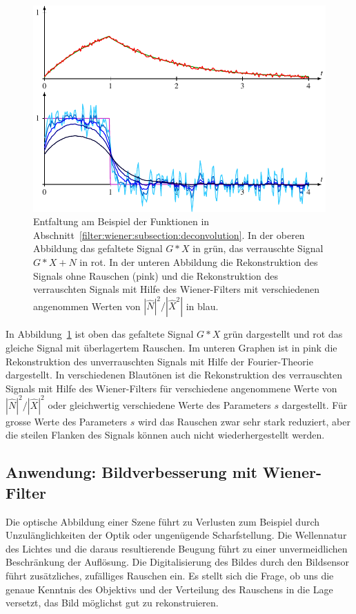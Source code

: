 \begin{figure}
\centering
\includegraphics{8-filter/images/filterung.pdf}
\caption{Entfaltung am Beispiel der Funktionen in
Abschnitt~\ref{filter:wiener:subsection:deconvolution}.
In der oberen Abbildung das gefaltete Signal $G*X$ in grün,
das verrauschte Signal $G*X+N$ in rot.
In der unteren Abbildung die Rekonstruktion des Signals ohne
Rauschen (pink) und die Rekonstruktion des verrauschten Signals
mit Hilfe des Wiener-Filters mit verschiedenen angenommen
Werten von $|\hat{N}|^2/|\hat{X}^2|$ in blau.
\label{filter:wiener:rekonstruktion}}
\end{figure}
In Abbildung~\ref{filter:wiener:rekonstruktion} ist oben das 
gefaltete Signal $G*X$ grün dargestellt und rot das gleiche Signal
mit überlagertem Rauschen.
Im unteren Graphen ist in pink die Rekonstruktion des unverrauschten
Signals mit Hilfe der Fourier-Theorie dargestellt.
In verschiedenen Blautönen ist die Rekonstruktion des verrauschten
Signals mit Hilfe des Wiener-Filters für verschiedene angenommene
Werte von $|\hat{N}|^2/|\hat{X}|^2$ oder gleichwertig verschiedene
Werte des Parameters $s$ dargestellt.
Für grosse Werte des Parameters $s$ wird das Rauschen zwar sehr stark
reduziert, aber die steilen Flanken des Signals können auch nicht
wiederhergestellt werden.

\subsection{Anwendung: Bildverbesserung mit Wiener-Filter
\label{filter:wiener:subsection:bildverbesserung}}
Die optische Abbildung einer Szene führt zu Verlusten zum Beispiel
durch Unzulänglichkeiten der Optik oder ungenügende Scharfstellung.
Die Wellennatur des Lichtes und die daraus resultierende
Beugung führt zu einer unvermeidlichen Beschränkung der Auflösung.
Die Digitalisierung des Bildes durch den Bildsensor führt zusätzliches,
zufälliges Rauschen ein.
Es stellt sich die Frage, ob uns die genaue Kenntnis des Objektivs und der
Verteilung des Rauschens in die Lage versetzt, das Bild möglichst
gut zu rekonstruieren.








